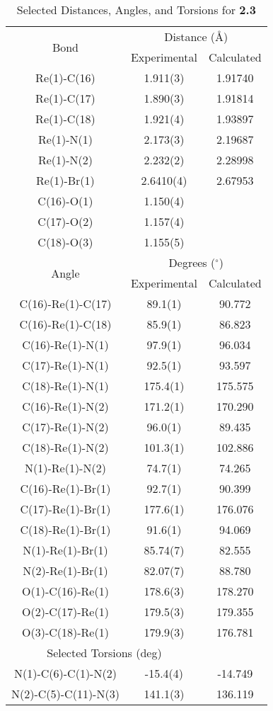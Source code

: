 \begin{table}[htbp]
  \caption{Selected Distances, Angles, and Torsions for \textbf{2.3}}
  \centering
    \begin{tabular}{ccc}
    \toprule
   \multirow{2}{*}{Bond} & \multicolumn{2}{c}{Distance (\r{A})} \\ \cline{2-3}
     & Experimental & Calculated \\ \midrule
    Re(1)-C(16) & 1.911(3) & 1.91740 \\
    Re(1)-C(17) & 1.890(3) & 1.91814 \\
    Re(1)-C(18) & 1.921(4) & 1.93897 \\
    Re(1)-N(1) & 2.173(3) & 2.19687 \\
    Re(1)-N(2) & 2.232(2) & 2.28998 \\
    Re(1)-Br(1) & 2.6410(4) & 2.67953 \\ 
    C(16)-O(1) & 1.150(4) & \\
    C(17)-O(2) & 1.157(4) & \\
    C(18)-O(3) & 1.155(5) & \\ \midrule
    \multirow{2}{*}{Angle} & \multicolumn{2}{c}{Degrees ($^\circ$)} \\ \cline{2-3}
     & Experimental & Calculated \\ \midrule
    C(16)-Re(1)-C(17) & 89.1(1) & 90.772 \\
    C(16)-Re(1)-C(18) & 85.9(1) & 86.823 \\
    C(16)-Re(1)-N(1) & 97.9(1) & 96.034 \\
    C(17)-Re(1)-N(1) & 92.5(1) & 93.597 \\
    C(18)-Re(1)-N(1) & 175.4(1) & 175.575 \\
    C(16)-Re(1)-N(2) & 171.2(1) & 170.290 \\
    C(17)-Re(1)-N(2) & 96.0(1) & 89.435 \\
    C(18)-Re(1)-N(2) & 101.3(1) & 102.886 \\
    N(1)-Re(1)-N(2) & 74.7(1) & 74.265 \\
    C(16)-Re(1)-Br(1) & 92.7(1) & 90.399 \\
    C(17)-Re(1)-Br(1) & 177.6(1) & 176.076 \\
    C(18)-Re(1)-Br(1) & 91.6(1) & 94.069 \\
    N(1)-Re(1)-Br(1) & 85.74(7) & 82.555 \\
    N(2)-Re(1)-Br(1) & 82.07(7) & 88.780 \\
    O(1)-C(16)-Re(1) & 178.6(3) & 178.270 \\
    O(2)-C(17)-Re(1) & 179.5(3) & 179.355 \\
    O(3)-C(18)-Re(1) & 179.9(3) & 176.781 \\ \midrule
    \multicolumn{2}{c}{Selected Torsions (deg)} \\ \midrule
    N(1)-C(6)-C(1)-N(2) & -15.4(4) & -14.749 \\
    N(2)-C(5)-C(11)-N(3) & 141.1(3) & 136.119 \\
    \bottomrule
    \end{tabular}%
  \label{tab.da3}%
\end{table}%


